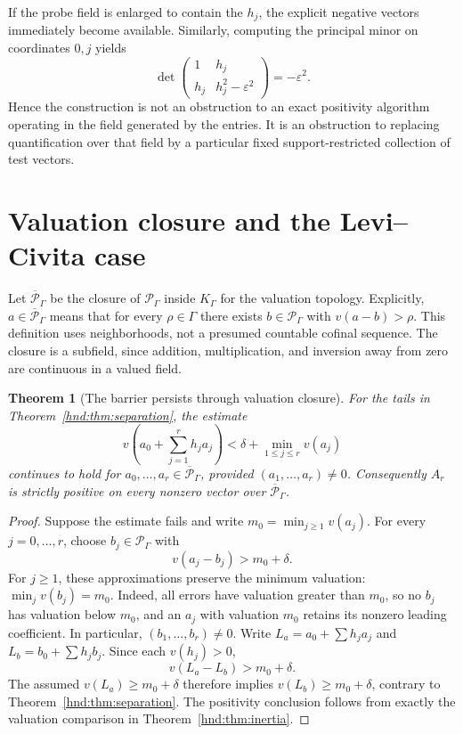 \documentclass[11pt,oneside]{article}
\newtheorem{theorem}{Theorem}[section]
\theoremstyle{definition}
\theoremstyle{remark}
\newcommand{\Pfield}{\mathscr P_\Gamma}
\newcommand{\eps}{\varepsilon}
\begin{document}
If the probe field is enlarged to contain the $h_j$, the explicit
negative vectors immediately become available. Similarly, computing the
principal minor on coordinates $0,j$ yields
\[
 \det\begin{pmatrix}1&h_j\\h_j&h_j^2-\eps^2\end{pmatrix}=-\eps^2.
\]
Hence the construction is not an obstruction to an exact positivity
algorithm operating in the field generated by the entries. It is an
obstruction to replacing quantification over that field by a particular
fixed support-restricted collection of test vectors.

\section{Valuation closure and the Levi--Civita case}\label{hnd:sec:closure}

Let $\overline{\mathscr P}_\Gamma$ be the closure of $\Pfield$ inside $K_\Gamma$
for the valuation topology. Explicitly, $a\in\overline{\mathscr P}_\Gamma$ means
that for every $\rho\in\Gamma$ there exists $b\in\Pfield$ with
$v(a-b)>\rho$. This definition uses neighborhoods, not a presumed
countable cofinal sequence. The closure is a subfield, since addition,
multiplication, and inversion away from zero are continuous in a valued
field.

\begin{theorem}[The barrier persists through valuation closure]
\label{hnd:thm:closedseparation}
For the tails in Theorem~\ref{hnd:thm:separation}, the estimate
\[
 v\!\left(a_0+\sum_{j=1}^r h_ja_j\right)
 <\delta+\min_{1\le j\le r}v(a_j)
\]
continues to hold for $a_0,\ldots,a_r\in\overline{\mathscr P}_\Gamma$, provided
$(a_1,\ldots,a_r)\ne0$.
Consequently $A_r$ is strictly positive on every nonzero vector over
$\overline{\mathscr P}_\Gamma$.
\end{theorem}
\begin{proof}
Suppose the estimate fails and write $m_0=\min_{j\ge1}v(a_j)$.
For every $j=0,\ldots,r$, choose $b_j\in\Pfield$ with
\[
 v(a_j-b_j)>m_0+\delta.
\]
For $j\ge1$, these approximations preserve the minimum valuation:
$\min_jv(b_j)=m_0$. Indeed, all errors have valuation greater than
$m_0$, so no $b_j$ has valuation below $m_0$, and an $a_j$ with
valuation $m_0$ retains its nonzero leading coefficient. In particular,
$(b_1,\ldots,b_r)\ne0$. Write
$L_a=a_0+\sum h_ja_j$ and $L_b=b_0+\sum h_jb_j$.
Since each $v(h_j)>0$,
\[
 v(L_a-L_b)>m_0+\delta.
\]
The assumed $v(L_a)\ge m_0+\delta$ therefore implies
$v(L_b)\ge m_0+\delta$, contrary to
Theorem~\ref{hnd:thm:separation}. The positivity conclusion follows from
exactly the valuation comparison in Theorem~\ref{hnd:thm:inertia}.
\end{proof}
\end{document}
